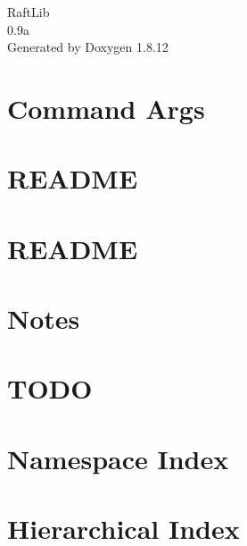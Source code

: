 \documentclass[twoside]{book}
\newcommand{\+}{\discretionary{\mbox{\scriptsize$\hookleftarrow$}}{}{}}
\newcommand{\clearemptydoublepage}{%
  \newpage{\pagestyle{empty}\cleardoublepage}%
}
\begin{document}
\hypersetup{pageanchor=false,
             bookmarksnumbered=true,
             pdfencoding=unicode
            }
\begin{titlepage}
\vspace*{7cm}
\begin{center}%
{\Large Raft\+Lib \\[1ex]\large 0.\+9a }\\
\vspace*{1cm}
{\large Generated by Doxygen 1.8.12}\\
\end{center}
\end{titlepage}
\clearemptydoublepage
{}
\tableofcontents
\clearemptydoublepage
{}
\hypersetup{pageanchor=true}

\chapter{Command Args}
\label{md_git-dep_cmdargs__r_e_a_d_m_e}
\hypertarget{md_git-dep_cmdargs__r_e_a_d_m_e}{}

\chapter{R\+E\+A\+D\+ME}
\label{md_git-dep_shm__r_e_a_d_m_e}
\hypertarget{md_git-dep_shm__r_e_a_d_m_e}{}

\chapter{R\+E\+A\+D\+ME}
\label{md__r_e_a_d_m_e}
\hypertarget{md__r_e_a_d_m_e}{}

\chapter{Notes}
\label{md_testsuite__t_o_d_o}
\hypertarget{md_testsuite__t_o_d_o}{}

\chapter{T\+O\+DO}
\label{md__t_o_d_o}
\hypertarget{md__t_o_d_o}{}

\chapter{Namespace Index}

\chapter{Hierarchical Index}

\end{document}
